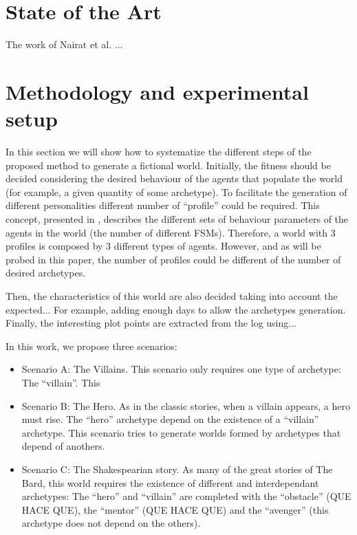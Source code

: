 \documentclass[runningheads,a4paper]{llncs}
\begin{document}
\section{State of the Art}

The work of Nairat et al. \cite{nairat:evolution} ...

\section{Methodology and experimental setup} %
\label{sec:met}

In this section we will show how to systematize the different steps of the proposed method to generate a fictional world. Initially, the fitness should be decided considering the desired behaviour of the agents that populate the world (for example, a given quantity of some archetype). To facilitate the generation of different personalities different number of ``profile'' could be required. This concept, presented in \cite{}, describes the different sets of behaviour parameters of the agents in the world (the number of different FSMs). Therefore, a world with 3 profiles is composed by 3 different types of agents. However, and as will be probed in this paper, the number of profiles could be different of the number of desired archetypes.

Then, the characteristics of this world are also decided taking into account the expected... For example, adding enough days to allow the archetypes generation. Finally, the interesting plot points are extracted from the log using... 



In this work, we propose three scenarios:
\begin{itemize}
\item Scenario A: The Villains. This scenario only requires one type of archetype: The ``villain''. This 
\item Scenario B: The Hero. As in the classic stories, when a villain appears, a hero must rise. The ``hero'' archetype depend on the existence of a ``villain'' archetype. This scenario tries to generate worlds formed by archetypes that depend of anothers.
\item Scenario C: The Shakespearian story. As many of the great stories of The Bard, this world requires the existence of different and interdependant archetypes: The ``hero'' and ``villain'' are completed with the ``obstacle'' (QUE HACE QUE), the  ``mentor'' (QUE HACE QUE) and the ``avenger'' (this archetype does not depend on the others).
\end{itemize}
\end{document}
